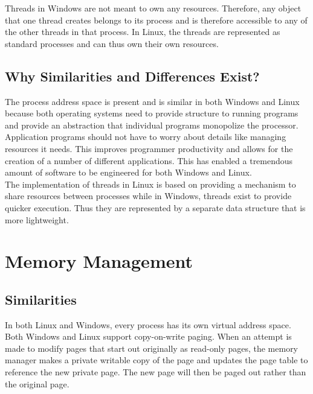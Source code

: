 \documentclass[letterpaper,10pt,titlepage]{article}
\begin{document}
Threads in Windows are not meant to own any resources. Therefore, any object
that one thread creates belongs to its process and is therefore accessible to 
any of the other threads in that process. In Linux, the threads are represented
as standard processes and can thus own their own resources. 

\subsection{Why Similarities and Differences Exist?}
The process address space is present and is similar in both Windows and Linux
because both operating systems need to provide structure to running programs
and provide an abstraction that individual programs monopolize the processor.
Application programs should not have to worry about details like managing 
resources it needs. This improves programmer productivity and allows for the
creation of a number of different applications. This has enabled a tremendous 
amount of software to be engineered for both Windows and Linux. 
\\
\linebreak
The implementation of threads in Linux is based on providing a mechanism to 
share resources between processes while in Windows, threads exist to provide
quicker execution. Thus they are represented by a separate data structure that 
is more lightweight.

\section{Memory Management}
\subsection{Similarities}
In both Linux and Windows, every process has its own virtual address space.
\\
\linebreak
Both Windows and Linux support copy-on-write paging. When an attempt is made
to modify pages that start out originally as read-only pages, the memory 
manager makes a private writable copy of the page and updates the page table 
to reference the new private page. The new page will then be paged out rather
than the original page.
\end{document}
